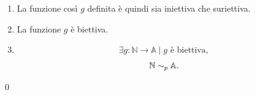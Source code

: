 \begin{demonstration}
\begin{enumerate}[label=(\roman*)]
\begin{enumerate}[label=\arabic*.]
            \item Prendendo $k\left(m\right) := \min \left\{p\in\mathbb{N}\mid f\left(p\right)\in\mathbb{X} \land p > h\left(m\right)\right\}$, allora
                \[
                    \begin{cases}
                        n\in\left\{p\in\mathbb{N}\mid f\left(p\right)\in\mathbb{X} \land p > h\left(m\right)\right\} \\
                        n < k\left(m\right)\\
                        \forall b\in \left\{p\in\mathbb{N}\mid f\left(p\right)\in\mathbb{X} \land p > h\left(m\right)\right\}, k\left(m\right) \leq b
                    \end{cases},
                \]
                \[
                    \begin{cases}
                        k\left(m\right) \leq n\\
                        n < k\left(m\right)\\
                    \end{cases},
                \]
                \[ n < k\left(m\right) \leq n, \]
                \[ n < n ,\]
                \[ n \neq n .\]
            \item La negazione della tesi porta a una contraddizione.
            \item La tesi secondo cui $g$ è suriettiva è necessariamente vera.
        \end{enumerate}
        \qed

        \item La funzione così $g$ definita è quindi sia iniettiva che suriettiva.
        \item La funzione $g$ è biettiva.
        \item \[ \exists g:\mathbb{N}\rightarrow\mathbb{A} \mid g \text{ è biettiva}, \]
            \[ \mathbb{N}\sim_p\mathbb{A}. \]
    \end{enumerate}
    \qed
\end{demonstration}